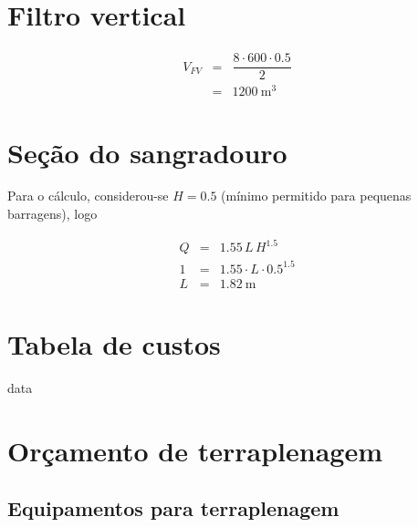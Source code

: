 \documentclass[a4paper, 12pt, brazilian]{article}
\begin{document}
	\section{Filtro vertical}
	
	\begin{eqnarray}
		V_{FV}&=&\dfrac{8\cdot 600\cdot 0.5}{2}\\
		&=&\SI{1200}{\meter^{3}}
	\end{eqnarray}
	
	\section{Seção do sangradouro}
	
	Para o cálculo, considerou-se $H=0.5$ (mínimo permitido para pequenas barragens), logo
	
	\begin{eqnarray}
		Q&=&1.55\,L\,H^{1.5}\\
		1&=&1.55\cdot L\cdot 0.5^{1.5}\\
		L&=&\SI{1.82}{\meter}
	\end{eqnarray}
	
	\section{Tabela de custos}
	
	{data}
	
	\newpage
	
	\section{Orçamento de terraplenagem}
	
	\subsection{Equipamentos para terraplenagem}
	
\end{document}
